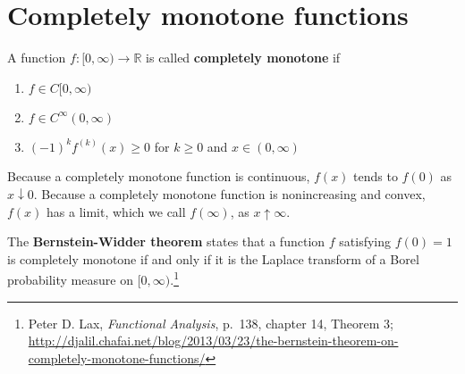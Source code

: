 \documentclass{article}
\theoremstyle{definition}
\theoremstyle{definition}
\begin{document}
\section{Completely monotone functions}
A function $f:[0,\infty) \to \mathbb{R}$ is called \textbf{completely monotone} if
\begin{enumerate}
\item $f \in C[0,\infty)$
\item $f \in C^\infty(0,\infty)$
\item $(-1)^k f^{(k)}(x) \geq 0$ for $k \geq 0$ and $x \in (0,\infty)$
\end{enumerate}
Because a completely monotone function is continuous, $f(x)$ tends to $f(0)$ as  $x \downarrow 0$.
Because a completely monotone function is nonincreasing and convex, 
$f(x)$ has a limit, which we call $f(\infty)$, as $x \uparrow \infty$. 

The \textbf{Bernstein-Widder theorem} states that a function $f$ satisfying
$f(0)=1$ is completely monotone if and only
if it is the Laplace transform of a Borel probability measure on $[0,\infty)$.\footnote{Peter D. Lax, {\em Functional Analysis}, p.~138, chapter 14, Theorem 3;
\url{http://djalil.chafai.net/blog/2013/03/23/the-bernstein-theorem-on-completely-monotone-functions/}}
\end{document}
